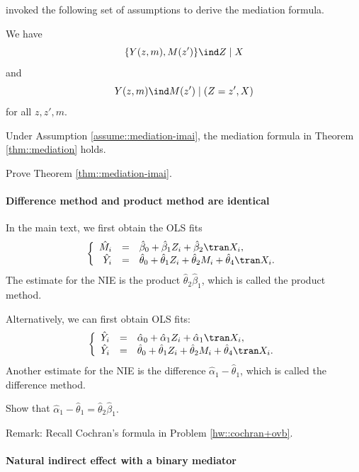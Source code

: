 \citet{Imai::2010} invoked the following set of assumptions to derive the mediation formula. 

\begin{assumption}
\label{assume::mediation-imai}
We have 
$$
\{Y(z, m), M(z') \} \ind  Z\mid X
$$
and
$$
Y(z, m) \ind M(z' ) \mid (Z=z' , X)
$$
for all $z, z', m$.
\end{assumption}


\begin{theorem}
\label{thm::mediation-imai}
Under Assumption \ref{assume::mediation-imai}, the mediation formula in Theorem \ref{thm::mediation} holds. 
\end{theorem}


Prove Theorem \ref{thm::mediation-imai}. 



\paragraph{Difference method and product method are identical}\label{hw::difference=product}


In the main text, we first obtain the OLS fits
$$
\left\{\begin{array}{rcl}
\hat M_i &=&  \hat\beta_0 + \hat\beta_1 Z_i + \hat\beta_2\tran X_i, \\
\hat Y_i &=&\hat \theta_0 + \hat\theta_1 Z_i +\hat \theta_2 M_i + \hat\theta_4\tran X_i.
\end{array}\right.
$$
The estimate for the NIE is the product $\hat \theta_2 \hat\beta_1 $, which is called the product method. 

Alternatively, we can first obtain OLS fits:
$$
\left\{\begin{array}{rcl}
\hat Y_i &=&  \hat\alpha_0 + \hat\alpha_1 Z_i + \hat\alpha_1 \tran X_i, \\
\hat Y_i &=&\hat \theta_0 + \hat\theta_1 Z_i +\hat \theta_2 M_i + \hat\theta_4\tran X_i.
\end{array}\right.
$$
Another estimate for the NIE is the difference $\hat\alpha_1 -  \hat\theta_1$, which is called the difference method. 

Show that $\hat\alpha_1 -  \hat\theta_1 = \hat \theta_2 \hat\beta_1 .$


Remark: Recall Cochran's formula in Problem \ref{hw::cochran+ovb}. 



\paragraph{Natural indirect effect with a binary mediator}\label{para::nie-binary-m}

